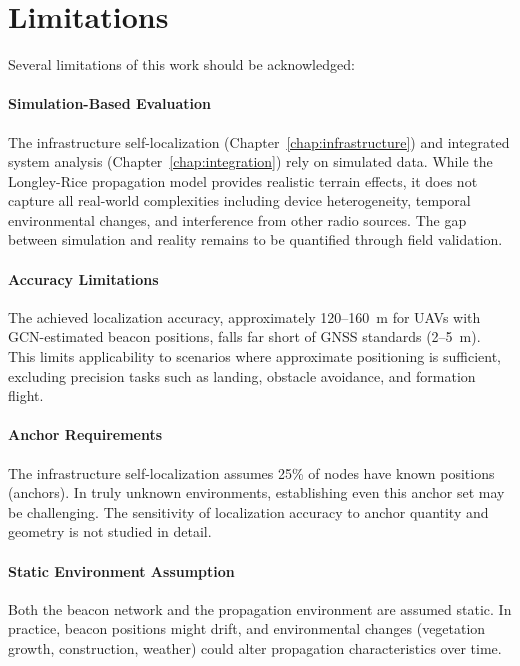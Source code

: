 \documentclass[master,final,11pt]{iscs-thesis}
\begin{document}
\section{Limitations}
\label{sec:limitations}

Several limitations of this work should be acknowledged:

\paragraph{Simulation-Based Evaluation}
The infrastructure self-localization (Chapter~\ref{chap:infrastructure}) and integrated system analysis (Chapter~\ref{chap:integration}) rely on simulated data.
While the Longley-Rice propagation model provides realistic terrain effects, it does not capture all real-world complexities including device heterogeneity, temporal environmental changes, and interference from other radio sources.
The gap between simulation and reality remains to be quantified through field validation.

\paragraph{Accuracy Limitations}
The achieved localization accuracy, approximately 120--160~m for UAVs with GCN-estimated beacon positions, falls far short of GNSS standards (2--5~m).
This limits applicability to scenarios where approximate positioning is sufficient, excluding precision tasks such as landing, obstacle avoidance, and formation flight.

\paragraph{Anchor Requirements}
The infrastructure self-localization assumes 25\% of nodes have known positions (anchors).
In truly unknown environments, establishing even this anchor set may be challenging.
The sensitivity of localization accuracy to anchor quantity and geometry is not studied in detail.

\paragraph{Static Environment Assumption}
Both the beacon network and the propagation environment are assumed static.
In practice, beacon positions might drift, and environmental changes (vegetation growth, construction, weather) could alter propagation characteristics over time.
\end{document}
